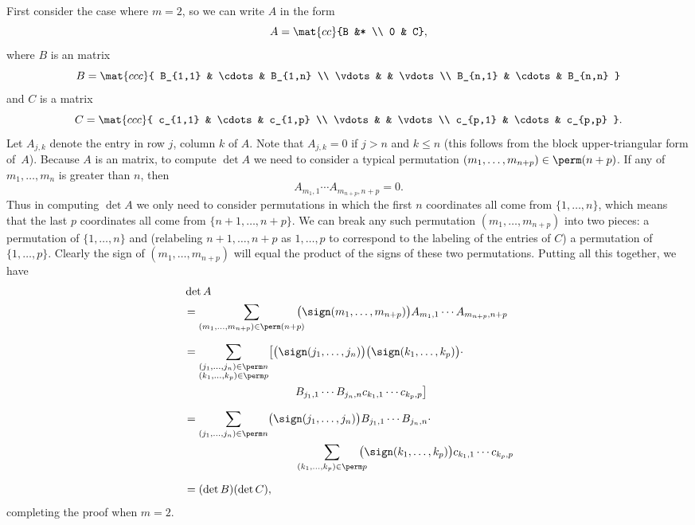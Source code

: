 \begin{Solution}
First consider the case where $m = 2$, so we can write $A$ in the form
\[
A = \mat{cc}{B &* \\ 0 & C},
\]
where $B$ is an  matrix
\[
B = \mat{ccc}{
B_{1,1} & \cdots & B_{1,n} \\
\vdots &   & \vdots \\
B_{n,1} & \cdots & B_{n,n} }
\]
and $C$ is a  matrix
\[
C = \mat{ccc}{
c_{1,1} & \cdots & c_{1,p} \\
\vdots &   & \vdots \\
c_{p,1} & \cdots & c_{p,p} }.
\]
Let $A_{j,k}$ denote the entry in row $j$, column $k$ of $A$.  Note that
$A_{j,k} = 0$ if $j > n$ and $k \le n$ (this follows from the block
upper-triangular form of~$A$).  Because $A$ is an  matrix, to
compute $\det A$ we need to consider a typical permutation
$(m_1, \ldots, m_{n+p}) \in \perm (n+p)$.  If any of
$m_1, \ldots, m_n$ is greater than $n$, then
\[
A_{m_1,1} \dotsm A_{m_{n+p},n+p} = 0.
\]
Thus in computing $\det A$ we only need to consider permutations in which the first
$n$ coordinates all come from $\{1, \ldots, n\}$, which means that the last $p$
coordinates all come from $\{n+1, \ldots, n+p\}$.  We can break any such permutation
$(m_1, \ldots, m_{n+p})$ into two pieces: a permutation of $\{1, \ldots, n\}$ and
(relabeling $n+1, \ldots, n + p$ as $1, \ldots, p$ to correspond to the labeling
of the entries of $C$) a permutation of $\{1, \ldots, p\}$.  Clearly the sign
of $(m_1, \ldots, m_{n+p})$ will equal the product of the signs of these two
permutations.  Putting all this together, we have
\begin{align*}
\hspace*{-.4in}&\det A\\
&= \sum_{(m_1, \ldots, m_{n+p}) \in \perm (n+p)} \hspace{-.1in}\bigl(\sign (m_1, \ldots,
m_{n+p})\bigr) A_{m_1,1} \dotsm A_{m_{n+p},{n+p}} \\[6bp]
&= \sum_{ \substack{
(j_1, \ldots, j_n) \in \perm n \\
(k_1, \ldots, k_p) \in \perm p} }
\bigl[ \bigl(\sign (j_1, \ldots, j_n)\bigr)
\bigl(\sign (k_1, \ldots, k_p)\bigr) \cdot \\
&\hspace*{100bp}B_{j_1,1} \dotsm B_{j_n,n} c_{k_1,1} \dotsm c_{k_p,p} \bigr] \\[6bp]
&= \sum_{(j_1, \ldots, j_n) \in \perm n}
\bigl(\sign (j_1, \ldots, j_n)\bigr) B_{j_1,1} \dotsm B_{j_n,n} \cdot \\
&\hspace*{100bp}
\sum_{(k_1, \ldots, k_p) \in \perm p}
\hspace{-.1in}\bigl(\sign (k_1, \ldots, k_p)\bigr)
c_{k_1,1} \dotsm c_{k_p,p} \\[6bp]
&= (\det B)(\det C),
\end{align*}
completing the proof when $m = 2$.


\end{Solution}
